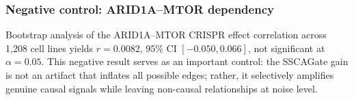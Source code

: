 \documentclass[12pt,a4paper]{article}
\begin{document}
\subsubsection*{Negative control: ARID1A--MTOR dependency}

Bootstrap analysis of the ARID1A--MTOR CRISPR effect correlation
across 1,208 cell lines yields $r = 0.0082$, 95\% CI
$[-0.050, 0.066]$, not significant at $\alpha = 0.05$. This negative
result serves as an important control: the SSCAGate gain is not an
artifact that inflates all possible edges; rather, it selectively
amplifies genuine causal signals while leaving non-causal
relationships at noise level.
\end{document}

